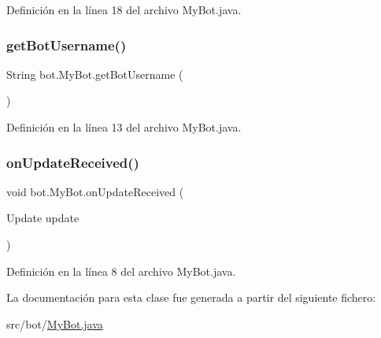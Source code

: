 Definición en la línea 18 del archivo My\+Bot.\+java.


\begin{DoxyCode}{0}

\end{DoxyCode}
\mbox{\label{classbot_1_1_my_bot_ada827aa5283dc9d85d411114b563c16c}} 
\subsubsection{\texorpdfstring{getBotUsername()}{getBotUsername()}}
{\footnotesize\ttfamily String bot.\+My\+Bot.\+get\+Bot\+Username (\begin{DoxyParamCaption}{ }\end{DoxyParamCaption})}



Definición en la línea 13 del archivo My\+Bot.\+java.


\begin{DoxyCode}{0}

\end{DoxyCode}
\mbox{\label{classbot_1_1_my_bot_a222fe9120fe705ceab16e5dbafaebefd}} 
\subsubsection{\texorpdfstring{onUpdateReceived()}{onUpdateReceived()}}
{\footnotesize\ttfamily void bot.\+My\+Bot.\+on\+Update\+Received (\begin{DoxyParamCaption}\item[{Update}]{update }\end{DoxyParamCaption})}



Definición en la línea 8 del archivo My\+Bot.\+java.


\begin{DoxyCode}{0}

\end{DoxyCode}


La documentación para esta clase fue generada a partir del siguiente fichero\+:\begin{DoxyCompactItemize}
\item 
src/bot/\mbox{\hyperlink{_my_bot_8java}{My\+Bot.\+java}}\end{DoxyCompactItemize}
